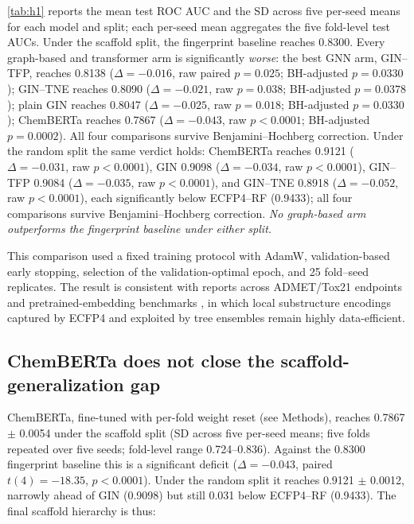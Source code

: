 \documentclass[11pt,a4paper]{article}
\begin{document}
\cref{tab:h1} reports the mean test ROC AUC and the SD across five per-seed means for each model and split; each per-seed mean aggregates the five fold-level test AUCs. Under the scaffold split, the fingerprint baseline reaches \num{0.8300}. Every graph-based and transformer arm is significantly \emph{worse}: the best GNN arm, GIN--TFP, reaches \num{0.8138} ($\Delta = -\num{0.016}$, raw paired $p = \num{0.025}$; BH-adjusted $p = \num{0.0330}$); GIN--TNE reaches \num{0.8090} ($\Delta = -\num{0.021}$, raw $p = \num{0.038}$; BH-adjusted $p = \num{0.0378}$); plain GIN reaches \num{0.8047} ($\Delta = -\num{0.025}$, raw $p = \num{0.018}$; BH-adjusted $p = \num{0.0330}$); ChemBERTa reaches \num{0.7867} ($\Delta = -\num{0.043}$, raw $p < \num{0.0001}$; BH-adjusted $p = \num{0.0002}$). All four comparisons survive Benjamini--Hochberg correction. Under the random split the same verdict holds: ChemBERTa reaches \num{0.9121} ($\Delta = -\num{0.031}$, raw $p < \num{0.0001}$), GIN \num{0.9098} ($\Delta = -\num{0.034}$, raw $p < \num{0.0001}$), GIN--TFP \num{0.9084} ($\Delta = -\num{0.035}$, raw $p < \num{0.0001}$), and GIN--TNE \num{0.8918} ($\Delta = -\num{0.052}$, raw $p < \num{0.0001}$), each significantly below ECFP4--RF (\num{0.9433}); all four comparisons survive Benjamini--Hochberg correction. \emph{No graph-based arm outperforms the fingerprint baseline under either split.}

This comparison used a fixed training protocol with AdamW, validation-based early stopping, selection of the validation-optimal epoch, and \num{25} fold--seed replicates. The result is consistent with reports across ADMET/Tox21 endpoints \citep{guo_ding_2026} and pretrained-embedding benchmarks \citep{benchmark_pretrained_2025}, in which local substructure encodings captured by ECFP4 and exploited by tree ensembles remain highly data-efficient.

\subsection{ChemBERTa does not close the scaffold-generalization gap}

ChemBERTa, fine-tuned with per-fold weight reset (see Methods), reaches \num{0.7867} $\pm$ \num{0.0054} under the scaffold split (SD across five per-seed means; five folds repeated over five seeds; fold-level range \numrange{0.724}{0.836}). Against the \num{0.8300} fingerprint baseline this is a significant deficit ($\Delta = -\num{0.043}$, paired $t(\num{4}) = \num{-18.35}$, $p < \num{0.0001}$). Under the random split it reaches \num{0.9121} $\pm$ \num{0.0012}, narrowly ahead of GIN (\num{0.9098}) but still \num{0.031} below ECFP4--RF (\num{0.9433}). The final scaffold hierarchy is thus:
\end{document}
